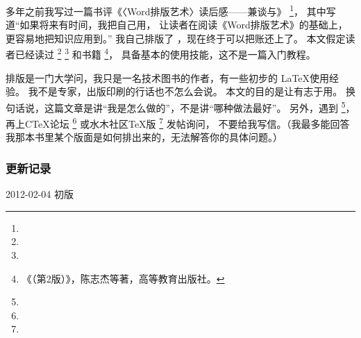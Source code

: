 多年之前我写过一篇书评《〈Word排版艺术〉读后感——兼谈与》
\footnote{}，
其中写道{\kaishu “如果将来有时间，我把自己用，
让读者在阅读《Word排版艺术》的基础上，更容易地把知识应用到。”}
我自己排版了 \mybooktitle，现在终于可以把账还上了。
本文假定读者已经读过
\footnote{}
\footnote{}
和书籍
\footnote{《（第2版）》，陈志杰等著，高等教育出版社。}，
具备基本的使用技能，这不是一篇入门教程。

排版是一门大学问，我只是一名技术图书的作者，有一些初步的 \LaTeX 使用经验。
我不是专家，出版印刷的行话也不怎么会说。
本文的目的是让有志于用。
换句话说，这篇文章是讲“我是怎么做的”，不是讲“哪种做法最好”。
另外，遇到
\footnote{}，再上CTeX论坛
\footnote{ } 或水木社区TeX版 \nolinebreak
\footnote{} 发帖询问，
不要给我写信。（我最多能回答我那本书里某个版面是如何排出来的，无法解答你的具体问题。）

\subsubsection{更新记录}
\begindot
\item[] 2012-02-04 初版
\myenddot
